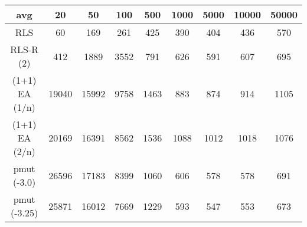 \begin{tabular}[h]{ccccccccc}
avg&20&50&100&500&1000&5000&10000&50000\\\hline
RLS&60&169&261&425&390&404&436&570\\
RLS-R (2)&412&1889&3552&791&626&591&607&695\\
(1+1) EA (1/n)&19040&15992&9758&1463&883&874&914&1105\\
(1+1) EA (2/n)&20169&16391&8562&1536&1088&1012&1018&1076\\
pmut (-3.0)&26596&17183&8399&1060&606&578&578&691\\
pmut (-3.25)&25871&16012&7669&1229&593&547&553&673\\
\end{tabular}
